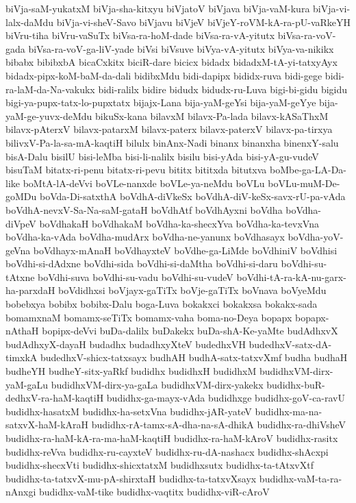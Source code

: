 {biVja-saM-yukatxM
biVja-sha-kitxyu
biVjatoV
biVjava
biVja-vaM-kura
biVja-vi-lalx-daMdu
biVja-vi-sheV-Savo
biVjavu
biVjeV
biVjeY-roVM-kA-ra-pU-vaRkeYH
biVru-tiha
biVru-vaSuTx
biVsa-ra-hoM-dade
biVsa-ra-vA-yitutx
biVsa-ra-voV-gada
biVsa-ra-voV-ga-liV-yade
biVsi
biVsuve
biVya-vA-yitutx
biVya-va-nikikx
bibabx
bibibxbA
bicaCxkitx
biciR-dare
bicicx
bidadx
bidadxM-tA-yi-tatxyAyx
bidadx-pipx-koM-baM-da-dali
bidibxMdu
bidi-dapipx
bididx-ruva
bidi-gege
bidi-ra-laM-da-Na-vakukx
bidi-ralilx
bidire
bidudx
bidudx-ru-Luva
bigi-bi-gidu
bigidu
bigi-ya-pupx-tatx-lo-pupxtatx
bijajx-Lana
bija-yaM-geYsi
bija-yaM-geYye
bija-yaM-ge-yuvx-deMdu
bikuSx-kana
bilavxM
bilavx-Pa-lada
bilavx-kASaThxM
bilavx-pAterxV
bilavx-patarxM
bilavx-paterx
bilavx-paterxV
bilavx-pa-tirxya
bilivxV-Pa-la-sa-mA-kaqtiH
bilulx
binAnx-Nadi
binanx
binanxha
binenxY-salu
bisA-Dalu
bisilU
bisi-leMba
bisi-li-nalilx
bisilu
bisi-yAda
bisi-yA-gu-vudeV
bisuTaM
bitatx-ri-penu
bitatx-ri-pevu
bititx
bititxda
bitutxva
boMbe-ga-LA-Da-like
boMtA-lA-deVvi
boVLe-nanxde
boVLe-ya-neMdu
boVLu
boVLu-muM-De-goMDu
boVda-Di-satxthA
boVdhA-diVkeSx
boVdhA-diV-keSx-savx-rU-pa-vAda
boVdhA-nevxV-Sa-Na-saM-gataH
boVdhAtf
boVdhAyxni
boVdha
boVdha-diVpeV
boVdhakaH
boVdhakaM
boVdha-ka-shecxYva
boVdha-ka-tevxVna
boVdha-ka-vAda
boVdha-mudArx
boVdha-ne-yanunx
boVdhasayx
boVdha-yoV-geVna
boVdhayx-mAnaH
boVdhayxteV
boVdhe-ga-LiMde
boVdhiniV
boVdhisi
boVdhi-si-dAdxne
boVdhi-sida
boVdhi-si-daMtha
boVdhi-si-daru
boVdhi-su-tAtxne
boVdhi-suva
boVdhi-su-vadu
boVdhi-su-vudeV
boVdhi-tA-ra-kA-nu-garx-ha-parxdaH
boVdidhxsi
boVjayx-gaTiTx
boVje-gaTiTx
boVnava
boVyeMdu
bobebxya
bobibx
bobibx-Dalu
boga-Luva
bokakxci
bokakxsa
bokakx-sada
bomamxnaM
bomamx-seTiTx
bomamx-vaha
boma-no-Deya
bopapx
bopapx-nAthaH
bopipx-deVvi
buDa-dalilx
buDakekx
buDa-shA-Ke-yaMte
budAdhxvX
budAdhxyX-dayaH
budadhx
budadhxyXteV
budedhxVH
budedhxV-satx-dA-timxkA
budedhxV-shicx-tatxsayx
budhAH
budhA-satx-tatxvXmf
budha
budhaH
budheYH
budheY-sitx-yaRkf
budidhx
budidhxH
budidhxM
budidhxVM-dirx-yaM-gaLu
budidhxVM-dirx-ya-gaLa
budidhxVM-dirx-yakekx
budidhx-buR-dedhxV-ra-haM-kaqtiH
budidhx-ga-mayx-vAda
budidhxge
budidhx-goV-ca-ravU
budidhx-hasatxM
budidhx-ha-setxVna
budidhx-jAR-yateV
budidhx-ma-na-satxvX-haM-kAraH
budidhx-rA-tamx-sA-dha-na-sA-dhikA
budidhx-ra-dhiVsheV
budidhx-ra-haM-kA-ra-ma-haM-kaqtiH
budidhx-ra-haM-kAroV
budidhx-rasitx
budidhx-reVva
budidhx-ru-cayxteV
budidhx-ru-dA-nashacx
budidhx-shAcxpi
budidhx-shecxVti
budidhx-shicxtatxM
budidhxsutx
budidhx-ta-tAtxvXtf
budidhx-ta-tatxvX-mu-pA-shirxtaH
budidhx-ta-tatxvXsayx
budidhx-vaM-ta-ra-nAnxgi
budidhx-vaM-tike
budidhx-vaqtitx
budidhx-viR-cAroV
}
